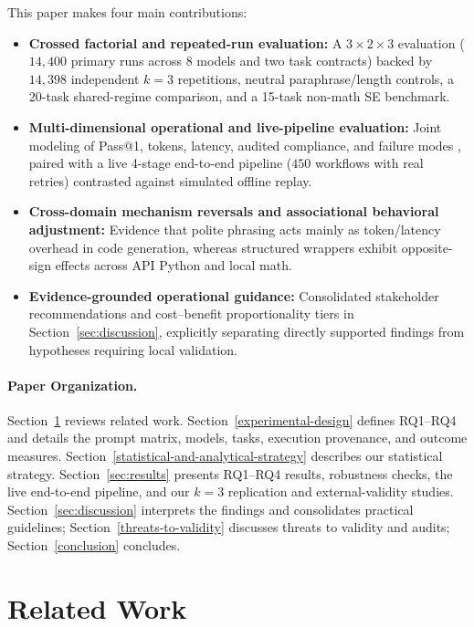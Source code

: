 \documentclass[a4paper,fleqn]{cas-sc}
\providecommand{\tightlist}{%
  \setlength{\itemsep}{0pt}\setlength{\parskip}{0pt}}
\begin{document}
    This paper makes four main contributions:
\begin{itemize}
\tightlist
\item \textbf{Crossed factorial and repeated-run evaluation:} A $3 \times 2 \times 3$ evaluation ($14{,}400$ primary runs across 8 models and two task contracts) backed by $14{,}398$ independent $k = 3$ repetitions, neutral paraphrase/length controls, a 20-task shared-regime comparison, and a 15-task non-math SE benchmark.
\item \textbf{Multi-dimensional operational and live-pipeline evaluation:} Joint modeling of Pass@1, tokens, latency, audited compliance, and failure modes \citep{liang2023helm, zhou2023ifeval}, paired with a live 4-stage end-to-end pipeline ($450$ workflows with real retries) contrasted against simulated offline replay.
\item \textbf{Cross-domain mechanism reversals and associational behavioral adjustment:} Evidence that polite phrasing acts mainly as token/latency overhead in code generation, whereas structured wrappers exhibit opposite-sign effects across API Python and local math.
\item \textbf{Evidence-grounded operational guidance:} Consolidated stakeholder recommendations and cost--benefit proportionality tiers in Section~\ref{sec:discussion}, explicitly separating directly supported findings from hypotheses requiring local validation.
\end{itemize}

\paragraph{Paper Organization.}
Section~\ref{sec:relatedwork} reviews related work. Section~\ref{experimental-design} defines RQ1--RQ4 and details the prompt matrix, models, tasks, execution provenance, and outcome measures. Section~\ref{statistical-and-analytical-strategy} describes our statistical strategy. Section~\ref{sec:results} presents RQ1--RQ4 results, robustness checks, the live end-to-end pipeline, and our $k = 3$ replication and external-validity studies. Section~\ref{sec:discussion} interprets the findings and consolidates practical guidelines; Section~\ref{threats-to-validity} discusses threats to validity and audits; Section~\ref{conclusion} concludes.


\section{Related Work}\label{sec:relatedwork}
\end{document}
